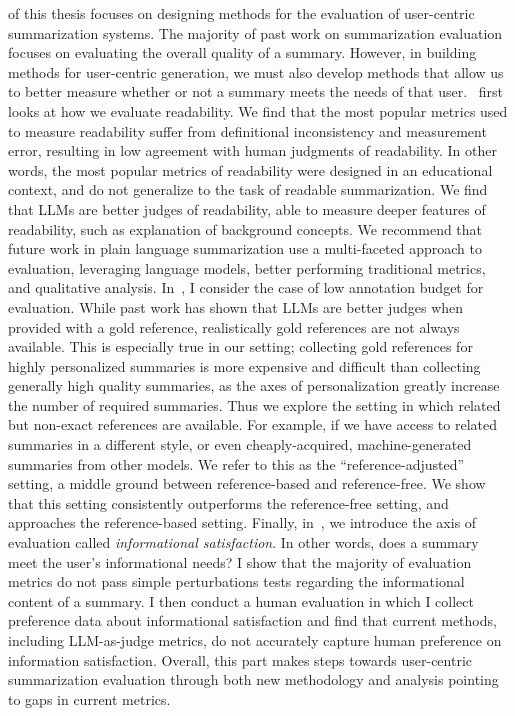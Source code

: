 of this thesis focuses on designing methods for the evaluation of user-centric summarization systems. The majority of past work on summarization evaluation focuses on evaluating the overall quality of a summary. However, in building methods for user-centric generation, we must also develop methods that allow us to better measure whether or not a summary meets the needs of that user.~ first looks at how we evaluate readability. We find that the most popular metrics used to measure readability suffer from definitional inconsistency and measurement error, resulting in low agreement with human judgments of readability. In other words, the most popular metrics of readability were designed in an educational context, and do not generalize to the task of readable summarization. We find that LLMs are better judges of readability, able to measure deeper features of readability, such as explanation of background concepts. We recommend that future work in plain language summarization use a multi-faceted approach to evaluation, leveraging language models, better performing traditional metrics, and qualitative analysis. In~, I consider the case of low annotation budget for evaluation. While past work has shown that LLMs are better judges when provided with a gold reference, realistically gold references are not always available. This is especially true in our setting; collecting gold references for highly personalized summaries is more expensive and difficult than collecting generally high quality summaries, as the axes of personalization greatly increase the number of required summaries. Thus we explore the setting in which related but non-exact references are available. For example, if we have access to related summaries in a different style, or even cheaply-acquired, machine-generated summaries from other models. We refer to this as the ``reference-adjusted'' setting, a middle ground between reference-based and reference-free. We show that this setting consistently outperforms the reference-free setting, and approaches the reference-based setting. Finally, in~, we introduce the axis of evaluation called \textit{informational satisfaction}. In other words, does a summary meet the user's informational needs? I show that the majority of evaluation metrics do not pass simple perturbations tests regarding the informational content of a summary. I then conduct a human evaluation in which I collect preference data about informational satisfaction and find that current methods, including LLM-as-judge metrics, do not accurately capture human preference on information satisfaction. Overall, this part makes steps towards user-centric summarization evaluation through both new methodology and analysis pointing to gaps in current metrics.

